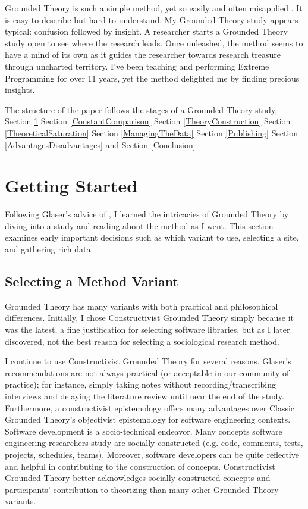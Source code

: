 Grounded Theory is such a simple method, yet so easily and often misapplied \cite{StolGroundedTheory}. It is easy to describe but hard to understand. My Grounded Theory study appears typical: confusion followed by insight. A researcher starts a Grounded Theory study open to see where the research leads. Once unleashed, the method seems to have a mind of its own as it guides the researcher towards research treasure through uncharted territory. I've been teaching and performing Extreme Programming for over 11 years, yet the method delighted me by finding precious insights. 

The structure of the paper follows the stages of a Grounded Theory study, Section \ref{GettingStarted}  Section \ref{ConstantComparison}  Section \ref{TheoryConstruction}  Section \ref{TheoreticalSaturation}   Section \ref{ManagingTheData}   Section \ref{Publishing}  Section \ref{AdvantagesDisadvantages}  and  Section \ref{Conclusion} 
\section{Getting Started}
\label{GettingStarted}

Following Glaser's advice of  \cite{GlaserIssues}, I learned the intricacies of Grounded Theory by diving into a study and reading about the method as I went. This section examines early important decisions such as which variant to use, selecting a site, and gathering rich data.
\subsection{Selecting a Method Variant}
Grounded Theory has many variants with both practical and philosophical differences. Initially, I chose Constructivist Grounded Theory simply because it was the latest, a fine justification for selecting software libraries, but as I later discovered, not the best reason for selecting a sociological research method. 

I continue to use Constructivist Grounded Theory for several reasons. Glaser's recommendations are not always practical (or acceptable in our community of practice); for instance, simply taking notes without recording/transcribing interviews and delaying the literature review until near the end of the study. Furthermore, a constructivist epistemology offers many advantages over Classic Grounded Theory's objectivist epistemology for software engineering contexts. Software development is a socio-technical endeavor. Many concepts software engineering researchers study are socially constructed (e.g. code, comments, tests, projects, schedules, teams). Moreover, software developers can be quite reflective and helpful in contributing to the construction of concepts. Constructivist Grounded Theory better acknowledges socially constructed concepts and participants' contribution to theorizing than many other Grounded Theory variants. 

